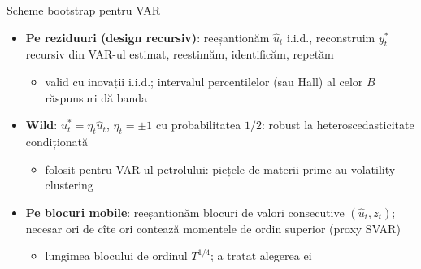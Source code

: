 \begin{frame}{Scheme bootstrap pentru VAR}
\itemsize{\small}
\begin{itemize}
    \item \textbf{Pe reziduuri (design recursiv)}: reeșantionăm $\hat u_t$ i.i.d., reconstruim $y^*_t$ recursiv din VAR-ul estimat, reestimăm, identificăm, repetăm
    \begin{itemize}
        \item valid cu inovații i.i.d.; intervalul percentilelor (sau Hall) al celor $B$ răspunsuri dă banda
    \end{itemize}
    \item \textbf{Wild}: $u^*_t = \eta_t\hat u_t$, $\eta_t = \pm1$ cu probabilitatea $1/2$: robust la heteroscedasticitate condiționată 
    \begin{itemize}
        \item folosit pentru VAR-ul petrolului: piețele de materii prime au volatility clustering
    \end{itemize}
    \item \textbf{Pe blocuri mobile}: reeșantionăm blocuri de valori consecutive $(\hat u_t, z_t)$; necesar ori de cîte ori contează momentele de ordin superior (proxy SVAR) 
    \begin{itemize}
        \item lungimea blocului de ordinul $T^{1/4}$;  a tratat alegerea ei
    \end{itemize}
\end{itemize}
\end{frame}

